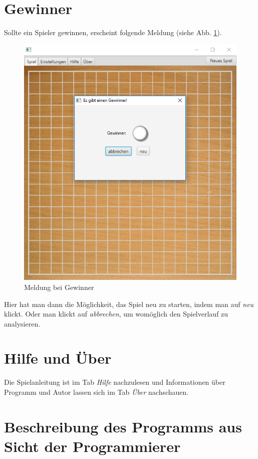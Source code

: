 \documentclass[11pt]{article}
\newcommand{\1}{{\mathds{1}}}
\newcommand{\imagewidth}{.4\textheight}%
\begin{document}
	\section{Gewinner}
	\FloatBarrier
	Sollte ein Spieler gewinnen, erscheint folgende Meldung (siehe Abb. \ref{gewinner}).
	\begin{figure}[h]
		\centering
		\includegraphics[width=\imagewidth]{gewinner.png}
		\caption{Meldung bei Gewinner}
		\label{gewinner}
	\end{figure}

	Hier hat man dann die Möglichkeit, das Spiel neu zu starten, indem man auf \textit{neu} klickt.
	Oder man klickt auf \textit{abbrechen}, um womöglich den Spielverlauf zu analysieren. 
	\FloatBarrier
	
	\section{Hilfe und Über}
	Die Spielanleitung ist im Tab \textit{Hilfe} nachzulesen und Informationen über Programm und Autor lassen sich im Tab \textit{Über} nachschauen. 
	
	
	\section*{Beschreibung des Programms aus Sicht der Programmierer}
	
\end{document}
